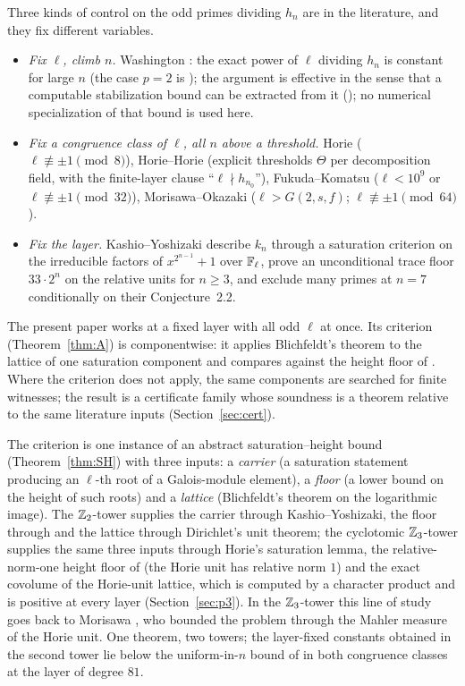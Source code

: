\documentclass[11pt]{amsart}
\theoremstyle{remark}\newtheorem{remark}[theorem]{Remark}
\theoremstyle{definition}\newtheorem{definition}[theorem]{Definition}
\begin{document}
Three kinds of control on the odd primes dividing $h_n$ are in the literature, and they fix different variables.
\begin{itemize}
\item[(i)] \emph{Fix $\ell$, climb $n$.} Washington \cite{Wa75,Wa78}: the exact power of $\ell$ dividing $h_n$ is constant for large $n$ (the case $p=2$ is \cite{Wa75}); the argument is effective in the sense that a computable stabilization bound can be extracted from it (\cite{Wa78}); no numerical specialization of that bound is used here.
\item[(ii)] \emph{Fix a congruence class of $\ell$, all $n$ above a threshold.} Horie \cite{Ho05,Ho07} ($\ell\not\equiv\pm1\pmod 8$), Horie--Horie \cite{HH09} (explicit thresholds $\Theta$ per decomposition field, with the finite-layer clause ``$\ell\nmid h_{n_0}$''), Fukuda--Komatsu \cite{FK3} ($\ell<10^9$ or $\ell\not\equiv\pm1\pmod{32}$), Morisawa--Okazaki \cite{MO16} ($\ell>G(2,s,f)$; $\ell\not\equiv\pm1\pmod{64}$).
\item[(iii)] \emph{Fix the layer.} Kashio--Yoshizaki \cite{KY} describe $k_n$ through a saturation criterion on the irreducible factors of $x^{2^{n-1}}+1$ over $\mathbb{F}_\ell$, prove an unconditional trace floor $33\cdot2^n$ on the relative units for $n\ge3$, and exclude many primes at $n=7$ conditionally on their Conjecture~2.2.
\end{itemize}
The present paper works at a fixed layer with all odd $\ell$ at once. Its criterion (Theorem~\ref{thm:A}) is componentwise: it applies Blichfeldt's theorem \cite{Bl14} to the lattice of one saturation component and compares against the height floor of \cite{MO16}. Where the criterion does not apply, the same components are searched for finite witnesses; the result is a certificate family whose soundness is a theorem relative to the same literature inputs (Section~\ref{sec:cert}).

The criterion is one instance of an abstract saturation--height bound (Theorem~\ref{thm:SH}) with three inputs: a \emph{carrier} (a saturation statement producing an $\ell$-th root of a Galois-module element), a \emph{floor} (a lower bound on the height of such roots) and a \emph{lattice} (Blichfeldt's theorem on the logarithmic image). The $\mathbb{Z}_2$-tower supplies the carrier through Kashio--Yoshizaki, the floor through \cite{MO16} and the lattice through Dirichlet's unit theorem; the cyclotomic $\mathbb{Z}_3$-tower supplies the same three inputs through Horie's saturation lemma, the relative-norm-one height floor of \cite{MO16} (the Horie unit has relative norm $1$) and the exact covolume of the Horie-unit lattice, which is computed by a character product and is positive at every layer (Section~\ref{sec:p3}). In the $\mathbb{Z}_3$-tower this line of study goes back to Morisawa \cite{Mo12}, who bounded the problem through the Mahler measure of the Horie unit. One theorem, two towers; the layer-fixed constants obtained in the second tower lie below the uniform-in-$n$ bound of \cite{MO16} in both congruence classes at the layer of degree $81$.
\end{document}
